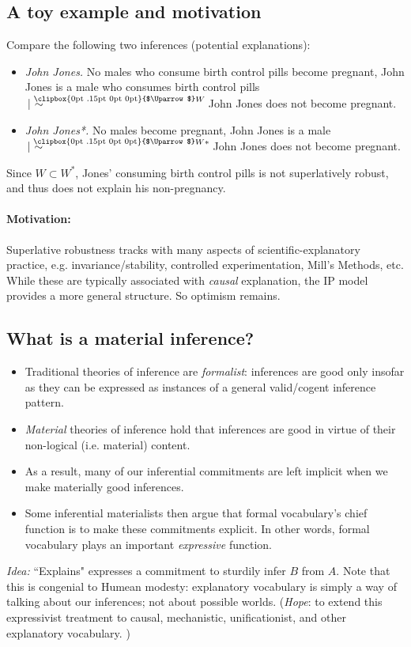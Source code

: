\documentclass[11pt]{article}
\makeatletter
\newcommand{\Uuparrow}{%
	\raisebox{.2ex}{\clipbox{0pt .15pt 0pt 0pt}{$\Uparrow$}}
}
\newcommand{\nms}{%
	\mathbin{\mathpalette\@nms\expandafter}
}
\newcommand{\@nms}{\mid\joinrel\mkern-.5mu\sim}
\newcommand{\mrc}[1]{\mathbin{
		\mathchoice
		{\normalsize\hspace{.5mm}\nms^{\mkern-19mu\scriptsize\Uuparrow#1}\hspace{-.5mm}}
		{\normalsize\hspace{.5mm}\nms^{\mkern-19mu\scriptsize\Uuparrow#1}\hspace{-.5mm}}
		{\footnotesize\hspace{.5mm}\nms^{\mkern-13.5mu\fontsize{5.5}{0}\Uuparrow#1}}
		{\scriptsize\nms^{\mkern-10mu\tiny\Uuparrow#1}}
	}
}
\makeatother
\begin{document}
\subsection{A toy example and motivation}
Compare the following two inferences (potential explanations):
\begin{itemize}
\item \textit{John Jones.} No males who consume birth control pills become pregnant, John Jones is a male who consumes birth control pills $\mrc{W}$ John Jones does not become pregnant. 
\item \textit{John Jones*.} No males become pregnant, John Jones is a male $\mrc{W*}$ John Jones does not become pregnant.
\end{itemize}
Since $W \subset W^*$, Jones' consuming birth control pills is not superlatively robust, and thus does not explain his non-pregnancy.
\paragraph{Motivation:} Superlative robustness tracks with many aspects of scientific-explanatory practice, e.g. invariance/stability, controlled experimentation, Mill's Methods, etc. While these are typically associated with \textit{causal} explanation, the IP model provides a more general structure. So optimism remains.

\subsection{What is a material inference?}
\begin{itemize}
	\item Traditional theories of inference are \textit{formalist}: inferences are good only insofar as they can be expressed as instances of a general valid/cogent inference pattern. 
	\item \textit{Material} theories of inference hold that inferences are good in virtue of their non-logical (i.e. material) content.
	\item As a result, many of our inferential commitments are left implicit when we make materially good inferences.
	\item Some inferential materialists then argue that formal vocabulary's chief function is to make these commitments explicit. In other words, formal vocabulary plays an important \textit{expressive} function. 
\end{itemize}
\textit{Idea:} ``Explains" expresses a commitment to sturdily infer $B$ from $A$. Note that this is congenial to Humean modesty: explanatory vocabulary is simply a way of talking about our inferences; not about possible worlds. (\textit{Hope}: to extend this expressivist treatment to causal, mechanistic, unificationist, and other explanatory vocabulary. )
\end{document}
